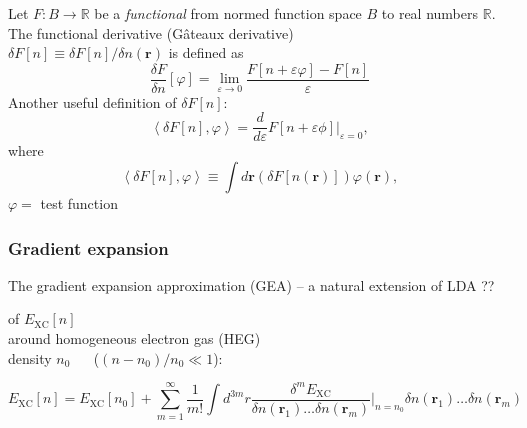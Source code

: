 \documentclass[compress]{beamer}
\begin{document}
\frame
{ 
  \frametitle{}
  \begin{small}
    {\scriptsize
      
      \begin{definition}
        Let $F:B\rightarrow \mathbb{R}$ be a \emph{functional} from  normed function space $B$ to real numbers $\mathbb{R}$. \\
        
        \vspace{2mm}
        The \alert{functional derivative} (G{\^a}teaux derivative) \\
        $\delta F[n]\equiv \delta F[n]/\delta n(\mathbf{r})$ is defined as
        \begin{equation}
          \frac{\delta F}{\delta n}[\varphi ]=\lim_{\varepsilon \rightarrow 0}\frac{F[n+\varepsilon \varphi ]-F[n]}{\varepsilon } \nonumber
        \end{equation}
        Another useful definition of $\delta F[n]$:
        \begin{equation}
          \left< \delta F[n],\varphi \right>=\frac{d}{d\varepsilon }F[n+\varepsilon \phi ]\Bigg\vert_{\varepsilon =0}, \nonumber
        \end{equation}
        where
        \begin{equation}
          \left< \delta F[n],\varphi \right>\equiv \int d\mathbf{r}(\delta F[n(\mathbf{r})])\varphi(\mathbf{r}), \nonumber
        \end{equation}
        $\varphi =$ test function 
      \end{definition}
    }
  \end{small}
}


\frame
{ 
  \frametitle{Gradient expansion}
  \begin{small}
    {\scriptsize
      The \alert{gradient expansion approximation (GEA)} -- a natural extension of LDA ??
      
      \vspace{2mm}
       of $E_{\mathrm{XC}}[n]$ \\
      around homogeneous electron gas (HEG) \\
      density $n_{0}$ $\quad $ ($(n-n_{0})/n_{0}\ll 1$):
      
     \begin{equation}
       E_{\mathrm{XC}}[n]=E_{\mathrm{XC}}[n_{0}]+\sum_{m=1}^{\infty }\frac{1}{m!}\int d^{3m}r \frac{\delta^{m}E_{\mathrm{XC}}}{\delta n(\mathbf{r}_{1})\dots \delta n(\mathbf{r}_{m})}\Bigg\vert_{n=n_{0}}\delta n(\mathbf{r}_{1})\dots \delta n(\mathbf{r}_{m}) \nonumber
     \end{equation}
    }
  \end{small}
}
\end{document}
